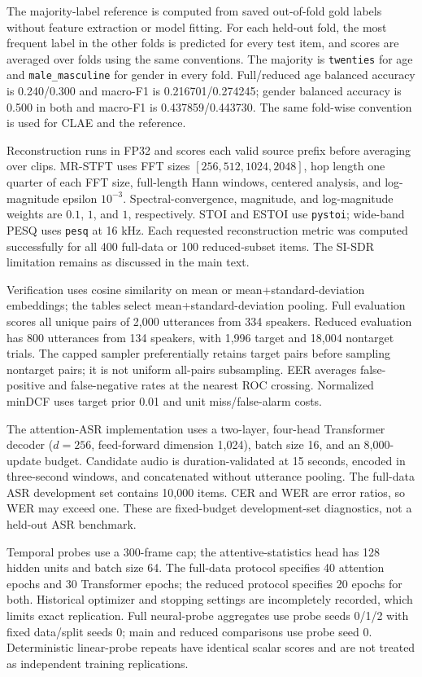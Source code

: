 \documentclass[11pt,a4paper]{article}
\begin{document}
The majority-label reference is computed from saved out-of-fold gold labels without feature extraction or model fitting. For each held-out fold, the most frequent label in the other folds is predicted for every test item, and scores are averaged over folds using the same conventions. The majority is \texttt{twenties} for age and \texttt{male\_masculine} for gender in every fold. Full/reduced age balanced accuracy is 0.240/0.300 and macro-F1 is 0.216701/0.274245; gender balanced accuracy is 0.500 in both and macro-F1 is 0.437859/0.443730. The same fold-wise convention is used for CLAE and the reference.

Reconstruction runs in FP32 and scores each valid source prefix before averaging over clips. MR-STFT uses FFT sizes $[256,512,1024,2048]$, hop length one quarter of each FFT size, full-length Hann windows, centered analysis, and log-magnitude epsilon $10^{-3}$. Spectral-convergence, magnitude, and log-magnitude weights are $0.1$, $1$, and $1$, respectively. STOI and ESTOI use \texttt{pystoi}; wide-band PESQ uses \texttt{pesq} at 16 kHz. Each requested reconstruction metric was computed successfully for all 400 full-data or 100 reduced-subset items. The SI-SDR limitation remains as discussed in the main text.

Verification uses cosine similarity on mean or mean+standard-deviation embeddings; the tables select mean+standard-deviation pooling. Full evaluation scores all unique pairs of 2,000 utterances from 334 speakers. Reduced evaluation has 800 utterances from 134 speakers, with 1,996 target and 18,004 nontarget trials. The capped sampler preferentially retains target pairs before sampling nontarget pairs; it is not uniform all-pairs subsampling. EER averages false-positive and false-negative rates at the nearest ROC crossing. Normalized minDCF uses target prior 0.01 and unit miss/false-alarm costs.

The attention-ASR implementation uses a two-layer, four-head Transformer decoder ($d=256$, feed-forward dimension 1,024), batch size 16, and an 8,000-update budget. Candidate audio is duration-validated at 15 seconds, encoded in three-second windows, and concatenated without utterance pooling. The full-data ASR development set contains 10,000 items. CER and WER are error ratios, so WER may exceed one. These are fixed-budget development-set diagnostics, not a held-out ASR benchmark.

Temporal probes use a 300-frame cap; the attentive-statistics head has 128 hidden units and batch size 64. The full-data protocol specifies 40 attention epochs and 30 Transformer epochs; the reduced protocol specifies 20 epochs for both. Historical optimizer and stopping settings are incompletely recorded, which limits exact replication. Full neural-probe aggregates use probe seeds 0/1/2 with fixed data/split seeds 0; main and reduced comparisons use probe seed 0. Deterministic linear-probe repeats have identical scalar scores and are not treated as independent training replications.
\end{document}
